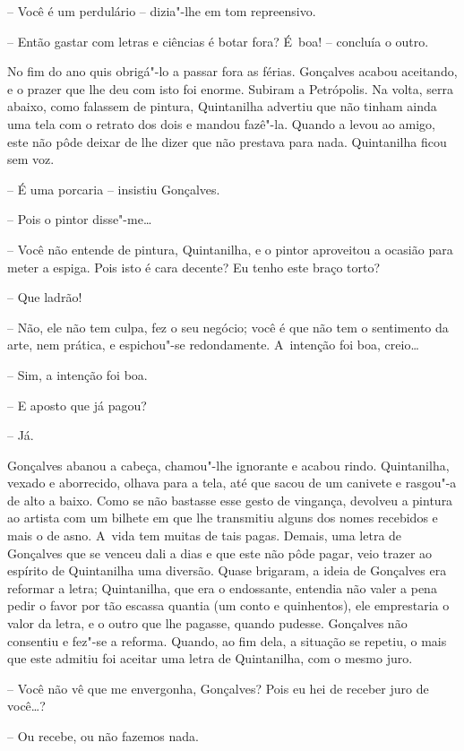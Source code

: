 -- Você é um perdulário -- dizia"-lhe em tom repreensivo.

-- Então gastar com letras e ciências é botar fora? É~boa! -- concluía o
outro.

No fim do ano quis obrigá"-lo a passar fora as férias. Gonçalves acabou
aceitando, e o prazer que lhe deu com isto foi enorme. Subiram a
Petrópolis. Na volta, serra abaixo, como falassem de pintura,
Quintanilha advertiu que não tinham ainda uma tela com o retrato dos
dois e mandou fazê"-la. Quando a levou ao amigo, este não pôde deixar de
lhe dizer que não prestava para nada. Quintanilha ficou sem voz.

-- É uma porcaria -- insistiu Gonçalves.

-- Pois o pintor disse"-me\ldots{}

-- Você não entende de pintura, Quintanilha, e o pintor aproveitou a
ocasião para meter a espiga. Pois isto é cara decente? Eu tenho este
braço torto?

-- Que ladrão!

-- Não, ele não tem culpa, fez o seu negócio; você é que não tem o
sentimento da arte, nem prática, e espichou"-se redondamente. A~intenção
foi boa, creio\ldots{}

-- Sim, a intenção foi boa.

-- E aposto que já pagou?

-- Já.

Gonçalves abanou a cabeça, chamou"-lhe ignorante e acabou rindo.
Quintanilha, vexado e aborrecido, olhava para a tela, até que sacou de
um canivete e rasgou"-a de alto a baixo. Como se não bastasse esse gesto
de vingança, devolveu a pintura ao artista com um bilhete em que lhe
transmitiu alguns dos nomes recebidos e mais o de asno. A~vida tem
muitas de tais pagas. Demais, uma letra de Gonçalves que se venceu dali
a dias e que este não pôde pagar, veio trazer ao espírito de Quintanilha
uma diversão. Quase brigaram, a ideia de Gonçalves era reformar a letra;
Quintanilha, que era o endossante, entendia não valer a pena pedir o
favor por tão escassa quantia (um conto e quinhentos), ele emprestaria o
valor da letra, e o outro que lhe pagasse, quando pudesse. Gonçalves não
consentiu e fez"-se a reforma. Quando, ao fim dela, a situação se
repetiu, o mais que este admitiu foi aceitar uma letra de Quintanilha,
com o mesmo juro.

-- Você não vê que me envergonha, Gonçalves? Pois eu hei de receber juro
de você\ldots{}?

-- Ou recebe, ou não fazemos nada.

